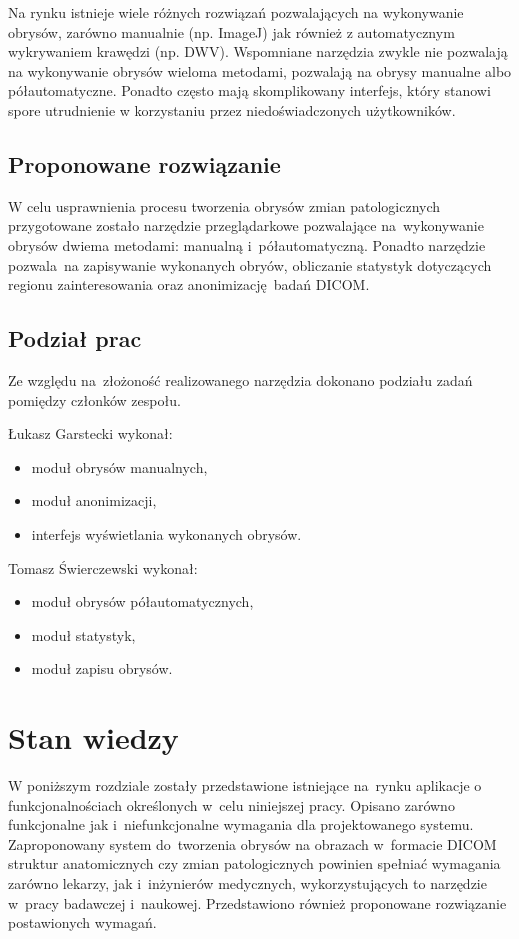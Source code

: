 \documentclass[a4paper,11pt,twoside,openright]{report}
\theoremstyle{definition}
\begin{document}
Na rynku istnieje wiele różnych rozwiązań pozwalających na wykonywanie obrysów,
zarówno manualnie (np. ImageJ) jak również z automatycznym wykrywaniem krawędzi (np. DWV).
Wspomniane narzędzia zwykle nie pozwalają na wykonywanie obrysów wieloma metodami,
pozwalają na obrysy manualne albo półautomatyczne. Ponadto często mają skomplikowany
interfejs, który stanowi spore utrudnienie w korzystaniu przez niedoświadczonych
użytkowników.

\section {Proponowane rozwiązanie}

W celu usprawnienia procesu tworzenia obrysów zmian patologicznych przygotowane
zostało narzędzie przeglądarkowe pozwalające na~wykonywanie obrysów dwiema metodami:
manualną i~półautomatyczną. Ponadto narzędzie pozwala~na zapisywanie wykonanych obryów,
obliczanie statystyk dotyczących regionu zainteresowania oraz anonimizację badań DICOM.

\section {Podział prac}

Ze względu na~złożoność realizowanego narzędzia dokonano podziału zadań pomiędzy
członków zespołu.

Łukasz Garstecki wykonał:

\begin{itemize}[noitemsep]
	\item moduł obrysów manualnych,
	\item moduł anonimizacji,
	\item interfejs wyświetlania wykonanych obrysów.
\end{itemize}

Tomasz Świerczewski wykonał:

\begin{itemize}[noitemsep]
\item moduł obrysów półautomatycznych,
\item moduł statystyk,
\item moduł zapisu obrysów.
\end{itemize}


\chapter {Stan wiedzy}

W poniższym rozdziale zostały przedstawione istniejące na~rynku aplikacje o
funkcjonalnościach określonych w~celu niniejszej pracy. Opisano zarówno funkcjonalne jak i~niefunkcjonalne
wymagania dla projektowanego systemu. Zaproponowany system do~tworzenia obrysów
na obrazach w~formacie DICOM struktur anatomicznych czy zmian patologicznych
powinien spełniać wymagania zarówno lekarzy, jak i~inżynierów medycznych, wykorzystujących
to narzędzie w~pracy badawczej i~naukowej. Przedstawiono również proponowane rozwiązanie
postawionych wymagań.
\end{document}
